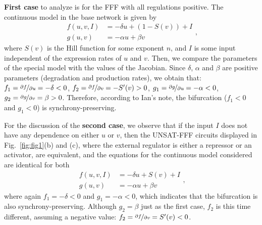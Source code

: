 \documentclass[12pt]{article}
\begin{document}
\textbf{First case} to analyze is for the FFF with all regulations positive. The continuous 
model in the base network is given by
\begin{equation}
    \begin{aligned}
        f(u,v,I) & = -\delta u + (1 - S(v)) + I\\
        g(u,v) & = -\alpha u + \beta v
    \end{aligned},
\end{equation}
where $S(v)$ is the Hill function for some exponent $n$, and $I$ is some input independent
of the expression rates of $u$ and $v$. Then, we compare the parameters of the special 
model with the values of the Jacobian. Since $\delta$, $\alpha$ and $\beta$ are positive 
parameters (degradation and production rates), we obtain that: $f_1 = \nicefrac{\partial f}{\partial u} 
= -\delta < 0$, $f_2 = \nicefrac{\partial f}{\partial v} = -S'(v) > 0$, $g_1 = 
\nicefrac{\partial g}{\partial u} = - \alpha < 0$, 
$g_2 = \nicefrac{\partial g}{\partial v} = \beta > 0$. Therefore, according to Ian's note, the bifurcation ($f_1 < 0$ 
and $g_1 < 0$) is {\color{red}synchrony-preserving}.


For the discussion of the \textbf{second case}, we observe that if the input 
$I$ does not have any dependence on either $u$ or $v$, 
then the UNSAT-FFF circuits displayed in Fig.~\ref{fig:fig1}(b) and (c), where the external 
regulator is either a repressor or an activator, are equivalent, and the equations 
for the continuous model considered are identical for both
\begin{equation}
    \begin{aligned}
        f(u,v,I) & = -\delta u + S(v) + I\\
        g(u,v) & = -\alpha u + \beta v
    \end{aligned},
\end{equation}
where again $f_1 = -\delta < 0$ and $g_1 = -\alpha < 0$, which indicates that the bifurcation 
is also {\color{red}synchrony-preserving}. Although $g_2 = \beta$ just as the first case, $f_2$
is this time different, assuming a negative value: $f_2 = \nicefrac{\partial f}{\partial v} = S'(v) < 0$.

%
%
\end{document}
